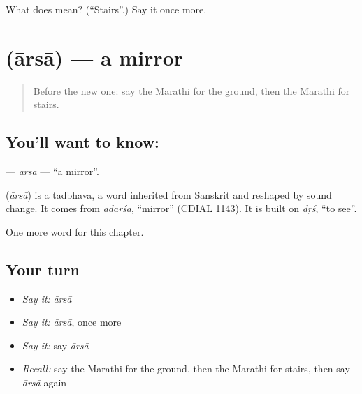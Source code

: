 \begin{tcolorbox}[breakable,colback=teal!4,colframe=teal!35!black,title={Before you move on}]
What does  mean? (\textquotedblleft{}Stairs\textquotedblright{}.) Say it once more.
\end{tcolorbox}
\section[\texorpdfstring{\mr{आरसा} (ārsā)}{आरसा (ārsā)}]{ (ārsā) — a mirror}

\label{lesson:MR-C91-arsa}



\begin{quote}
Before the new one: say the Marathi for the ground, then the Marathi for stairs.
\end{quote}

\subsection*{You'll want to know: }
\textbf{} — \emph{ārsā} — \textquotedblleft{}a mirror\textquotedblright{}.

\begin{cousinweb}
\textbf{} (\emph{ārsā}) is a tadbhava, a word inherited from Sanskrit and reshaped by sound change. It comes from \emph{ādarśa}, \textquotedblleft{}mirror\textquotedblright{} (CDIAL 1143). It is built on \emph{dṛś}, \textquotedblleft{}to see\textquotedblright{}.
\end{cousinweb}

\begin{grammarlens}[title={What you've built}]
One more word for this chapter.
\end{grammarlens}

\subsection*{Your turn}
\begin{itemize}
\raggedright
  \item \emph{Say it:} \emph{ārsā}
  \item \emph{Say it:} \emph{ārsā}, once more
  \item \emph{Say it:} say \emph{ārsā}
  \item \emph{Recall:} say the Marathi for the ground, then the Marathi for stairs, then say \emph{ārsā} again
\end{itemize}

